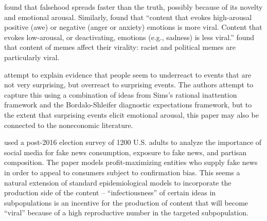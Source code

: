 

\href{https://science.sciencemag.org/content/359/6380/1146}{\cite{vosoughi_spread_2018}} found that falsehood spreads faster than the truth, possibly because of its novelty and emotional arousal.  Similarly, \href{https://journals.sagepub.com/doi/10.1509/jmr.10.0353}{\cite{berger2012makes}} found that ``content that evokes high-arousal positive (awe) or negative (anger or anxiety) emotions is more viral. Content that evokes low-arousal, or deactivating, emotions (e.g., sadness) is less viral.'' \href{https://arxiv.org/abs/1805.12512}{\cite{zannettou2018origins}} found that content of memes affect their virality: racist and political memes are particularly viral.

\cite{kohlhasasymmetric} attempt to explain evidence that people seem to underreact to events that are not very surprising, but overreact to surprising events.  The authors attempt to capture this using a combination of ideas from Sims's rational inattention framework and the Bordalo-Shleifer diagnostic expectations framework, but to the extent that surprising events elicit emotional arousal, this paper may also be connected to the noneconomic literature.  %


\href{https://github.com/iworld1991/EpiExp/blob/master/Literature/allcott2017social.pdf}{\cite{allcott2017social}} used a post-2016 election survey of 1200 U.S. adults to analyze the importance of social media for fake news consumption, exposure to fake news, and partisan composition.  The paper models profit-maximizing entities who supply fake news in order to appeal to consumers subject to confirmation bias. This seems a natural extension of standard epidemiological models to incorporate the production side of the content -- ``infectiousness'' of certain ideas in subpopulations is an incentive for the production of content that will become ``viral'' because of a high reproductive number in the targeted subpopulation.

